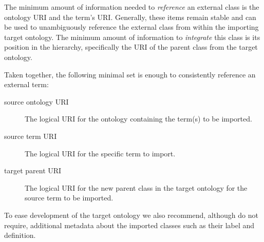 \documentclass{elsart3p}    %
\newcommand{\protege}{Prot\'{e}g\'{e}}
\begin{document}
The minimum amount of information needed to \textit{reference} an external class is the ontology URI and the term's URI.
Generally, these items remain stable and can be used to unambiguously reference the external class from within the importing target ontology.
The minimum amount of information to \textit{integrate} this class is its position in the hierarchy, specifically the URI of the parent class from the target ontology.


Taken together, the following minimal set is enough to consistently reference an external term:
\begin{description}
 \item[source ontology URI] The logical URI for the ontology containing the term(s) to be imported. %
 \item[source term URI] The logical URI for the specific term to import. %
 \item[target parent URI] The logical URI for the new parent class in the target ontology for the source term to be imported. %
 \end{description} 
 


To ease development of the target ontology we also recommend, although do not require, additional metadata about the imported classes such as their label and definition.



\end{document}
